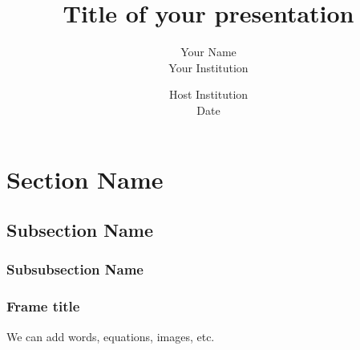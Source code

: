 \documentclass[xcolor=dvipsnames]{beamer}
\title{\Large{Title of your presentation}}
\author{\large{\color{Black} Your Name} \\ \color{Black} Your Institution}
\date{\color{Black} Host Institution \\ \color{Black} Date}
\begin{document}

\begin{frame}

\titlepage 


\centering

\end{frame}






\section{Section Name}
\subsection{Subsection Name}
\subsubsection{Subsubsection Name}

\begin{frame}
\frametitle{Frame title}

We can add words, equations, images, etc.

\centering

\end{frame}

\end{document}
